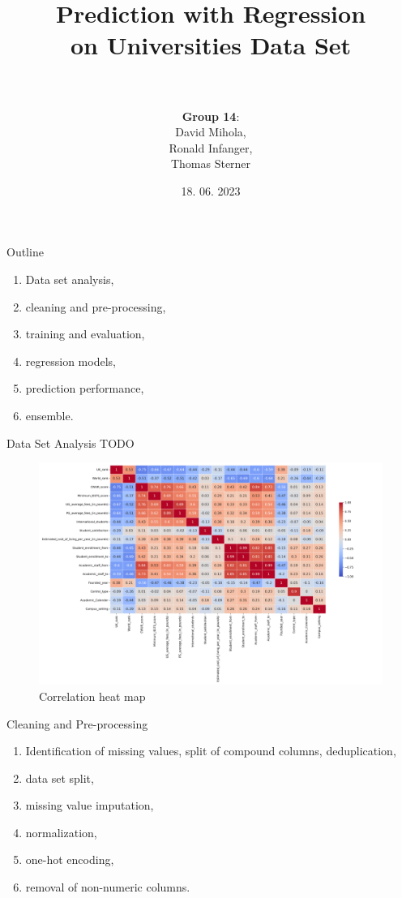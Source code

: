 \documentclass{beamer} %
\title[Prediction with Regression on Universities Data Set]{Prediction with Regression\\on Universities Data Set\\\normalsize \\}
\author{\textbf{Group 14}: \\David Mihola, \\Ronald Infanger, \\Thomas Sterner}
\date{18. 06. 2023}
\begin{document}
\begin{frame}
  \maketitle
\end{frame}

\begin{frame}{Outline}
  \vspace{-1cm}
  \begin{enumerate}
      \item Data set analysis,
      \item cleaning and pre-processing,
      \item training and evaluation,
      \item regression models,
      \item prediction performance,
      \item ensemble.
  \end{enumerate}
\end{frame}


\begin{frame}{Data Set Analysis}
  TODO
\end{frame}
\begin{frame}{}
  \vspace{-0.3cm}
  \begin{figure}
    \centering
    \includegraphics[width=0.94 \textwidth]{figs/correlation_heatmap.png}
    \caption{Correlation heat map}
    \label{fig:corr_heatmap}
\end{figure}
\end{frame}

\begin{frame}{Cleaning and Pre-processing}
  \vspace{-1cm}
  \begin{enumerate}
      \item Identification of missing values, split of compound columns, deduplication,
      \item data set split,
      \item missing value imputation,
      \item normalization,
      \item one-hot encoding,
      \item removal of non-numeric columns.
  \end{enumerate}
\end{frame}
\end{document}
